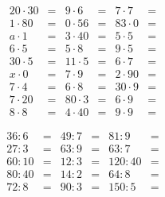\documentclass[12pt, a4paper]{article}
\begin{document}
\begin{align*}
20\cdot30  &=& 9\cdot6   &=&  7\cdot7  &=\\
1\cdot80  &=& 0\cdot56  &=&  83\cdot0 &=\\
a\cdot1  &=& 3\cdot40   &=&  5\cdot 5 &=\\
6\cdot5  &=& 5\cdot8   &=&  9\cdot 5 &=\\
30\cdot5 &=& 11\cdot5  &=&  6\cdot 7 &=\\
x\cdot0  &=& 7\cdot 9  &=&  2\cdot 90 &=\\
7\cdot4  &=& 6\cdot 8  &=&  30\cdot 9 &=\\
7\cdot20 &=& 80\cdot3  &=&  6\cdot 9 &=\\
8\cdot8  &=&  4\cdot40 &=&  9\cdot 9 &=
\end{align*}

\begin{align*}
    36:6  &=& 49:7 &=&  81:9 &=\\
    27:3  &=& 63:9 &=&  63:7 &=\\
    60:10 &=& 12:3 &=& 120:40&=\\
    80:40 &=& 14:2 &=& 64:8  &=\\
    72:8  &=& 90:3 &=& 150:5 &=
\end{align*}
\end{document}
